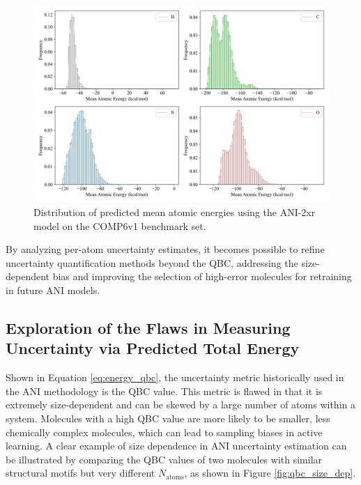 \begin{figure}[H]
    \centering
    \includegraphics[width=1\linewidth]{Images/2xr_outputs/2xr_comp6v1_mean-ae-per-atomtype.png}
    \caption[Mean atomic energy prediction per-atom with ANI-2xr]{Distribution of predicted mean atomic energies using the ANI-2xr model on the COMP6v1 benchmark set.}
    \label{fig:2xr_comp6v1_mean-ae-per-atomtype}
\end{figure}

By analyzing per-atom uncertainty estimates, it becomes possible to refine uncertainty quantification methods beyond the QBC, addressing the size-dependent bias and improving the selection of high-error molecules for retraining in future ANI models.

\subsection{Exploration of the Flaws in Measuring Uncertainty via Predicted Total Energy}
\label{subsec:flaws_in_qbc}

Shown in Equation \ref{eq:energy_qbc}, the uncertainty metric historically used in the ANI methodology is the QBC value. 
This metric is flawed in that it is extremely size-dependent and can be skewed by a large number of atoms within a system. 
Molecules with a high QBC value are more likely to be smaller, less chemically complex molecules, which can lead to sampling biases in active learning.
A clear example of size dependence in ANI uncertainty estimation can be illustrated by comparing the QBC values of two molecules with similar structural motifs but very different $N_{\text{atoms}}$, as shown in Figure \ref{fig:qbc_size_dep}.

